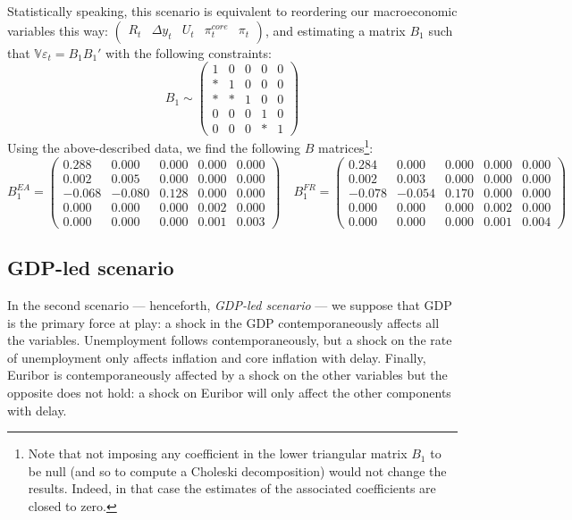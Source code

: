 \documentclass[
  11pt,
]{article}
\begin{document}
Statistically speaking, this scenario is equivalent to reordering our macroeconomic variables this way: \(\begin{pmatrix} R_{t} &\Delta y_{t} & U_{t} &\pi^{core}_{t} &\pi_{t} \end{pmatrix}\), and estimating a matrix \(B_1\) such that \(\mathbb V\varepsilon_t=B_1B_1'\) with the following constraints:
\[ B_1\sim\begin{pmatrix}1 & 0 & 0 & 0 & 0\\
* & 1 & 0 & 0 & 0\\
* & * & 1 & 0 & 0\\
0 & 0 & 0 & 1 & 0\\
0 & 0 & 0 & * & 1
\end{pmatrix}\]
Using the above-described data, we find the following \(B\) matrices\footnote{
  Note that not imposing any coefficient in the lower triangular matrix \(B_1\) to be null (and so to compute a Choleski decomposition) would not change the results.
  Indeed, in that case the estimates of the associated coefficients are closed to zero.}:
\[B_1^{EA} =\begin{pmatrix}
 0.288 & 0.000 & 0.000 & 0.000 & 0.000 \\
0.002 & 0.005 & 0.000 & 0.000 & 0.000 \\
-0.068 & -0.080 & 0.128 & 0.000 & 0.000 \\
0.000 & 0.000 & 0.000 & 0.002 & 0.000 \\
0.000 & 0.000 & 0.000 & 0.001 & 0.003 
\end{pmatrix}
\quad
B_1^{FR}=\begin{pmatrix}
 0.284 & 0.000 & 0.000 & 0.000 & 0.000 \\
0.002 & 0.003 & 0.000 & 0.000 & 0.000 \\
-0.078 & -0.054 & 0.170 & 0.000 & 0.000 \\
0.000 & 0.000 & 0.000 & 0.002 & 0.000 \\
0.000 & 0.000 & 0.000 & 0.001 & 0.004 
\end{pmatrix}\]

\hypertarget{gdp-led-scenario}{%
\subsection{GDP-led scenario}\label{gdp-led-scenario}}

In the second scenario --- henceforth, \emph{GDP-led scenario} --- we suppose that GDP is the primary force at play: a shock in the GDP contemporaneously affects all the variables.
Unemployment follows contemporaneously, but a shock on the rate of unemployment only affects inflation and core inflation with delay.
Finally, Euribor is contemporaneously affected by a shock on the other variables but the opposite does not hold: a shock on Euribor will only affect the other components with delay.
\end{document}

